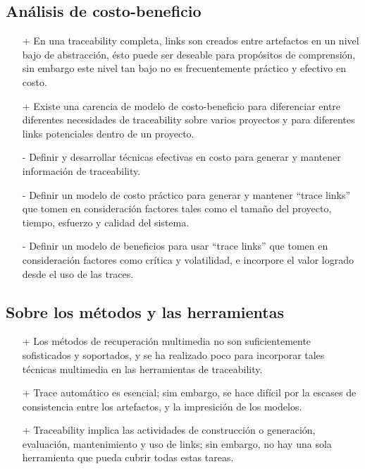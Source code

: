 \documentclass[a4paper,12pt,oneside]{book}
\begin{document}
\subsection{Análisis de costo-beneficio}

\begin{itemize}
\item[+]     En una traceability completa, links son creados entre artefactos en un nivel bajo de abstracción, ésto puede ser deseable para propósitos de comprensión, sin embargo este nivel tan bajo no es frecuentemente práctico y efectivo en costo.
\item[+]    Existe una carencia de modelo de costo-beneficio para diferenciar entre diferentes necesidades de traceability sobre varios proyectos y para diferentes links potenciales dentro de un proyecto.
\end{itemize}

\begin{itemize}
\item[-]     Definir y desarrollar técnicas efectivas en costo para generar y mantener información de traceability.
\item[-]    Definir un modelo de costo práctico para generar y mantener “trace links” que tomen en consideración factores tales como el tamaño del proyecto, tiempo, esfuerzo y calidad del sistema.
 \item[-]   Definir un modelo de beneficios para usar “trace links” que tomen en consideración factores como crítica y volatilidad, e incorpore el valor logrado desde el uso de las traces.
\end{itemize}

\subsection{Sobre los métodos y las herramientas}

\begin{itemize}
\item[+]     Los métodos de recuperación multimedia no son suficientemente sofisticados y soportados, y se ha realizado poco para incorporar tales técnicas multimedia en las herramientas de traceability.
\item[+]   Trace automático es esencial; sim embargo, se hace difícil por la escases de consistencia entre los artefactos, y la impresición de los modelos.
\item[+]    Traceability implica las actividades de construcción o generación, evaluación, mantenimiento y uso de links; sin embargo, no hay una sola herramienta que pueda cubrir todas estas tareas.
\end{itemize}
\end{document}
